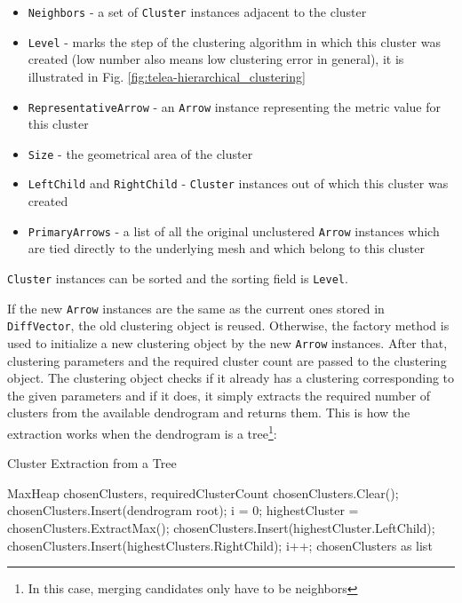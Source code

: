 \begin{itemize}
\item \verb+Neighbors+ - a set of \verb+Cluster+ instances adjacent to the cluster
\item \verb+Level+ - marks the step of the clustering algorithm in which this cluster was created (low number also means low clustering error in general), it is illustrated in Fig. \ref{fig:telea-hierarchical_clustering}
\item \verb+RepresentativeArrow+ - an \verb+Arrow+ instance representing the metric value for this cluster
\item \verb+Size+ - the geometrical area of the cluster
\item \verb+LeftChild+ and \verb+RightChild+ - \verb+Cluster+ instances out of which this cluster was created
\item \verb+PrimaryArrows+ - a list of all the original unclustered \verb+Arrow+ instances which are tied directly to the underlying mesh and which belong to this cluster
\end{itemize}

\verb+Cluster+ instances can be sorted and the sorting field is \verb+Level+.

If the new \verb+Arrow+ instances are the same as the current ones stored in \verb+DiffVector+, the old clustering object is reused. Otherwise, the factory method is used to initialize a new clustering object by the new \verb+Arrow+ instances. After that, clustering parameters and the required cluster count are passed to the clustering object. The clustering object checks if it already has a clustering corresponding to the given parameters and if it does, it simply extracts the required number of clusters from the available dendrogram and returns them. This is how the extraction works when the dendrogram is a tree\footnote{In this case, merging candidates only have to be neighbors}:

\begin{algorithm}[H]
\caption{Cluster Extraction from a Tree}
\begin{algorithmic}[1]

\Require MaxHeap chosenClusters, requiredClusterCount
\Statex
\State chosenClusters.Clear();
\State chosenClusters.Insert(dendrogram root);
\State i = 0;
	\State highestCluster = chosenClusters.ExtractMax();
    \State chosenClusters.Insert(highestCluster.LeftChild);
    \State chosenClusters.Insert(highestClusters.RightChild);
    \State i++;
\EndWhile
\Statex
\Return chosenClusters as list
\end{algorithmic}
\end{algorithm}

